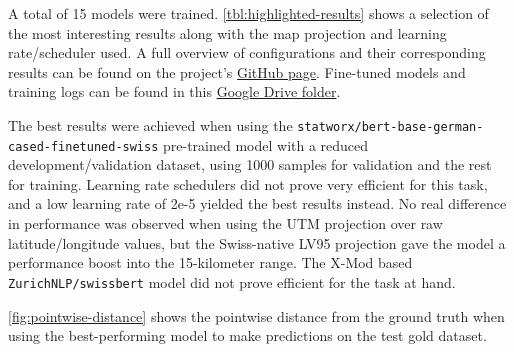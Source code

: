 A total of 15 models were trained. \autoref{tbl:highlighted-results} shows a selection of the most interesting results along with the map projection and learning rate/scheduler used. A full overview of configurations and their corresponding results can be found on the project's \href{https://github.com/oskarhlm/TDT13}{GitHub page}. Fine-tuned models and training logs can be found in this \href{https://drive.google.com/drive/folders/1-6nAdhvf5DBHtWzpZa6iH7z0dFETi80h?usp=sharing}{Google Drive folder}.

The best results were achieved when using the \texttt{statworx/bert-base-german-cased-finetuned-swiss} pre-trained model with a reduced development/validation dataset, using 1000 samples for validation and the rest for training. Learning rate schedulers did not prove very efficient for this task, and a low learning rate of 2e-5 yielded the best results instead. No real difference in performance was observed when using the UTM projection over raw latitude/longitude values, but the Swiss-native LV95 projection gave the model a performance boost into the 15-kilometer range. The X-Mod based \texttt{ZurichNLP/swissbert} model did not prove efficient for the task at hand.

\autoref{fig:pointwise-distance} shows the pointwise distance from the ground truth when using the best-performing model to make predictions on the test gold dataset.


